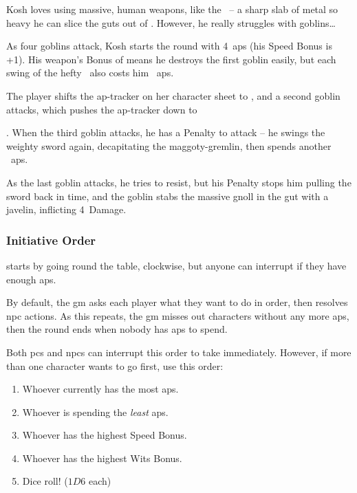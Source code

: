 \begin{multicols}{2}
\begin{exampletext}
  \noindent
  Kosh loves using massive, human weapons, like the \greatsword\weaponName\ -- a sharp slab of metal so heavy he can slice the guts out of .
  However, he really struggles with goblins\ldots

  As four goblins attack, Kosh starts the \gls{round} with 4~\glspl{ap} (his Speed Bonus is +1).
  His weapon's Bonus of  means he destroys the first goblin easily, but each swing of the hefty \weaponName\ also costs him ~\glspl{ap}.
  \setcounter{track}{4}
  \addtocounter{track}{-\value{heft}}

  The player shifts the \gls{ap}-tracker on her character sheet to , and a second goblin attacks, which pushes the \gls{ap}-tracker down to
  \addtocounter{track}{-\value{heft}}
  .
  When the third goblin attacks, he has a  Penalty to attack -- he swings the weighty sword again, decapitating the maggoty-gremlin, then spends another ~\glspl{ap}.
  \addtocounter{track}{-\value{heft}}
  As the last goblin attacks, he tries to resist, but his  Penalty stops him pulling the sword back in time, and the goblin stabs the massive gnoll in the gut with a javelin, inflicting 4~Damage.
\end{exampletext}

\subsubsection{Initiative Order}
\label{initiativeOrdering}
starts by going round the table, clockwise, but anyone can interrupt if they have enough \glspl{ap}.

By default, the \gls{gm} asks each player what they want to do in order, then resolves \gls{npc} actions.
As this repeats, the \gls{gm} misses out characters without any more \glspl{ap}, then the \gls{round} ends when nobody has \glspl{ap} to spend.

Both \glspl{pc} and \glspl{npc} can interrupt this order to take  immediately.
However, if more than one character wants to go first, use this order:

\begin{enumerate}
  \item
  Whoever currently has the most \glspl{ap}.
  \item
  Whoever is spending the \emph{least} \glspl{ap}.
  \item
  Whoever has the highest Speed Bonus.
  \item
  Whoever has the highest Wits Bonus.
  \item
  Dice roll! ($1D6$ each)
\end{enumerate}


\end{multicols}
